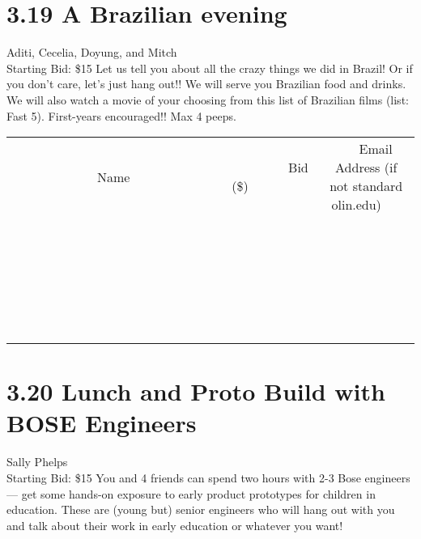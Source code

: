 \documentclass[11pt]{article}
\begin{document}
\section*{3.19 A Brazilian evening}
Aditi, Cecelia, Doyung, and Mitch
\\
Starting Bid: \$15
\newline
Let us tell you about all the crazy things we did in Brazil! Or if you don't care, let's just hang out!! We will serve you Brazilian food and drinks. We will also watch a movie of your choosing from this list of Brazilian films (list: Fast 5). First-years encouraged!! Max 4 peeps.
\\[6ex]
\begin{tabular}{c c c}
~~~~~~~~~~~~~Name~~~~~~~~~~~~~ & ~~~~~~~~~Bid (\$)~~~~~~~~~  & ~~~Email Address (if not standard olin.edu)~~~\\
 & & \\
\hline
 & & \\
\hline
 & & \\
\hline
 & & \\
\hline
 & & \\
\hline
 & & \\
\hline
 & & \\
\hline
 & & \\
\hline
 & & \\
\hline
 & & \\
\hline
 & & \\
\hline
 & & \\
\hline
 & & \\
\hline
 & & \\
\hline
 & & \\
\hline
 & & \\
\hline
 & & \\
\hline
 & & \\
\hline
 & & \\
\hline
 & & \\
\hline
 & & \\
\hline
 & & \\
\hline
 & & \\
\hline
 & & \\
\hline
 & & \\
\hline
 & & \\
\hline
\end{tabular}
\newpage
\section*{3.20 Lunch and Proto Build with BOSE Engineers}
Sally Phelps
\\
Starting Bid: \$15
\newline
You and 4 friends can spend two hours with 2-3 Bose engineers –– get some hands-on exposure to early product prototypes for children in education.   These are (young but) senior engineers who will hang out with you and talk about their work in early education or whatever you want!
 
\end{document}
